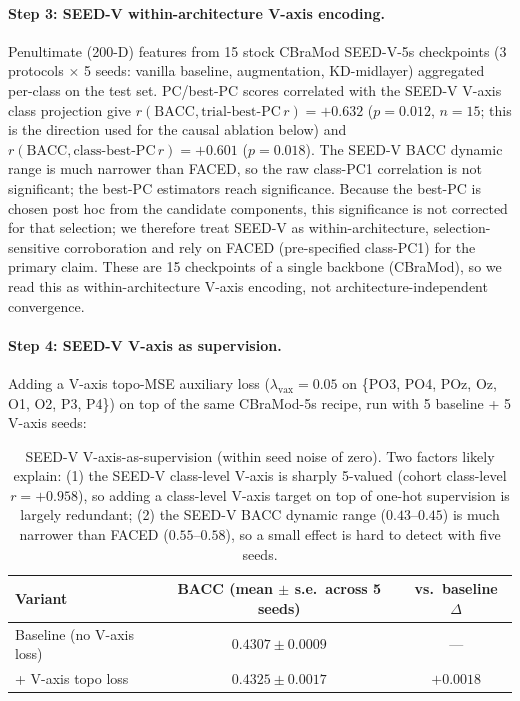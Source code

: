 \paragraph{Step 3: SEED-V within-architecture V-axis encoding.}
Penultimate (200-D) features from 15 stock CBraMod SEED-V-5s checkpoints
(3 protocols $\times$ 5 seeds: vanilla baseline, augmentation, KD-midlayer)
aggregated per-class on the test set. PC/best-PC scores
correlated with the SEED-V V-axis class projection give
$r(\mathrm{BACC}, \text{trial-best-PC}\,r) = +0.632$ ($p=0.012$, $n=15$;
this is the direction used for the causal ablation below) and
$r(\mathrm{BACC}, \text{class-best-PC}\,r) = +0.601$ ($p=0.018$). The
SEED-V BACC dynamic range is much narrower than FACED, so the raw
class-PC1 correlation is not significant; the best-PC estimators reach
significance. Because the best-PC is chosen post hoc from the candidate
components, this significance is not corrected for that selection; we
therefore treat SEED-V as within-architecture, selection-sensitive
corroboration and rely on FACED (pre-specified class-PC1) for the
primary claim. These are 15 checkpoints of a single backbone (CBraMod),
so we read this as within-architecture V-axis encoding, not
architecture-independent convergence.

\paragraph{Step 4: SEED-V V-axis as supervision.}
Adding a V-axis topo-MSE auxiliary loss
($\lambda_{\mathrm{vax}}{=}0.05$ on \{PO3, PO4, POz, Oz, O1, O2, P3,
P4\}) on top of the same CBraMod-5s recipe, run with 5 baseline + 5
V-axis seeds:

\begin{table}[h]
\centering
\small
\begin{tabular}{lcc}
\toprule
Variant & BACC (mean $\pm$ s.e.\ across 5 seeds) & vs.\ baseline $\Delta$ \\
\midrule
Baseline (no V-axis loss) & $0.4307 \pm 0.0009$ & --- \\
+ V-axis topo loss        & $0.4325 \pm 0.0017$ & $+0.0018$ \\
\bottomrule
\end{tabular}
\caption{SEED-V V-axis-as-supervision (within seed noise of zero). Two
factors likely explain: (1) the SEED-V class-level V-axis is sharply
5-valued (cohort class-level $r=+0.958$), so adding a class-level
V-axis target on top of one-hot supervision is largely redundant; (2)
the SEED-V BACC dynamic range ($0.43$--$0.45$) is much narrower than
FACED ($0.55$--$0.58$), so a small effect is hard to detect with five
seeds.}
\label{tab:seedv-step4}
\end{table}

